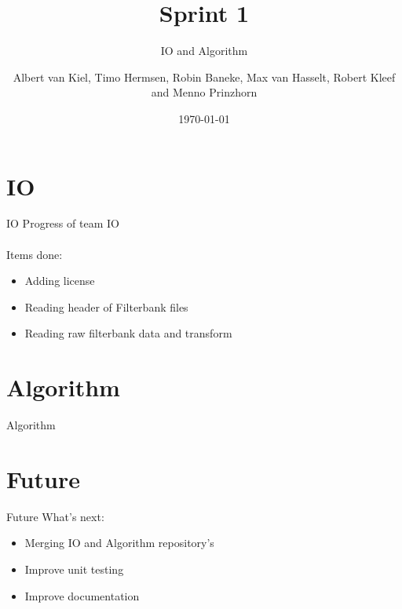 \documentclass{beamer}
\title{Sprint 1}
\subtitle{IO and Algorithm}
\author{Albert van Kiel, Timo Hermsen, Robin Baneke, Max van Hasselt, Robert Kleef and Menno Prinzhorn}
\date{\today}
\begin{document}
\begin{frame}
    \titlepage
\end{frame}

\section{IO}
    
\begin{frame}{IO}
    Progress of team IO
    \\~\\
    Items done:
    \begin{itemize}
        \item Adding license
        \item Reading header of Filterbank files
        \item Reading raw filterbank data and transform
    \end{itemize}
\end{frame}


\section{Algorithm}
    
\begin{frame}{Algorithm}
\end{frame}


\section{Future}

\begin{frame}{Future}
    What's next:       
    \begin{itemize}
        \item Merging IO and Algorithm repository's
        \item Improve unit testing
        \item Improve documentation
    \end{itemize}
\end{frame}
\end{document}
